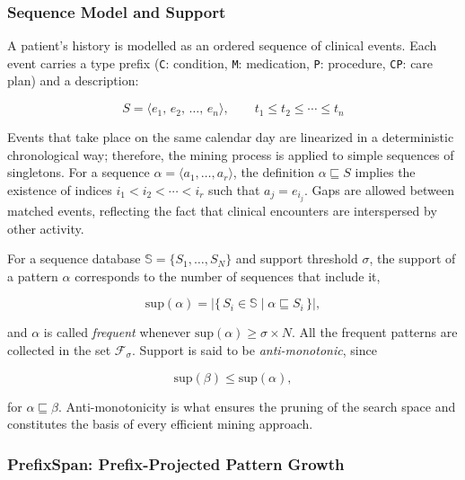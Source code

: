 \subsubsection*{Sequence Model and Support}

A patient's history is modelled as an ordered sequence of clinical events. Each event carries a type prefix (\texttt{C}: condition, \texttt{M}: medication, \texttt{P}: procedure, \texttt{CP}: care plan) and a description:

\begin{equation}
    S = \langle e_1,\, e_2,\, \ldots,\, e_n \rangle, \qquad t_1 \leq t_2 \leq \cdots \leq t_n
    \label{eq:sequence}
\end{equation}

Events that take place on the same calendar day are linearized in a deterministic chronological way; therefore, the mining process is applied to simple sequences of singletons. For a sequence $\alpha = \langle a_1, \ldots, a_r \rangle$, the definition $\alpha \sqsubseteq S$ implies the existence of indices $i_1 < i_2 < \cdots < i_r$ such that $a_j = e_{i_j}$. Gaps are allowed between matched events, reflecting the fact that clinical encounters are interspersed by other activity.

For a sequence database $\mathbb{S} = \{S_1, \ldots, S_N\}$ and support threshold $\sigma$, the support of a pattern $\alpha$ corresponds to the number of sequences that include it,

\begin{equation}
    \mathrm{sup}(\alpha) = \bigl|\{\, S_i \in \mathbb{S} \mid \alpha \sqsubseteq S_i \,\}\bigr|,
    \label{eq:support}
\end{equation}

and $\alpha$ is called \emph{frequent} whenever $\mathrm{sup}(\alpha) \geq \sigma \times N$. All the frequent patterns are collected in the set $\mathcal{F}_\sigma$. Support is said to be \emph{anti-monotonic}, since

\begin{equation}
    \mathrm{sup}(\beta) \leq \mathrm{sup}(\alpha),
    \label{eq:antimonotone}
\end{equation}

for $\alpha \sqsubseteq \beta$. Anti-monotonicity is what ensures the pruning of the search space and constitutes the basis of every efficient mining approach.

\subsubsection*{PrefixSpan: Prefix-Projected Pattern Growth}
\label{ch:prefix_span_theory}

